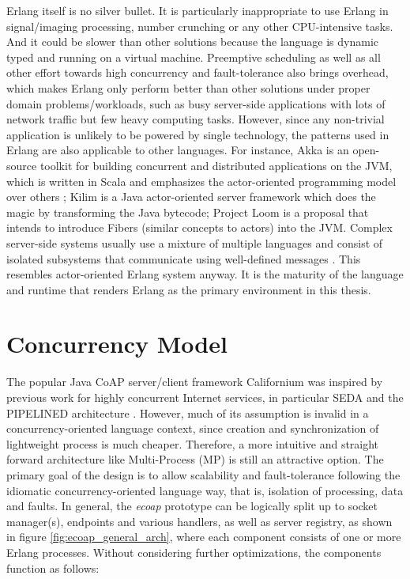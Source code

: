 Erlang itself is no silver bullet. It is particularly inappropriate to use Erlang in signal/imaging processing, number crunching or any other CPU-intensive tasks. And it could be slower than other solutions because the language is dynamic typed and running on a virtual machine. Preemptive scheduling as well as all other effort towards high concurrency and fault-tolerance also brings overhead, which makes Erlang only perform better than other solutions under proper domain problems/workloads, such as busy server-side applications with lots of network traffic but few heavy computing tasks. However, since any non-trivial application is unlikely to be powered by single technology, the patterns used in Erlang are also applicable to other languages. For instance, Akka \cite{akka} is an open-source toolkit for building concurrent and distributed applications on the JVM, which is written in Scala and emphasizes the actor-oriented programming model over others ; Kilim \cite{srinivasan2008kilim}\cite{UCAM-CL-TR-769} is a Java actor-oriented server framework which does the magic by transforming the Java bytecode; Project Loom \cite{java-loom} is a proposal that intends to introduce Fibers (similar concepts to actors) into the JVM. Complex server-side systems usually use a mixture of multiple languages and consist of isolated subsystems that communicate using well-defined messages \cite{UCAM-CL-TR-769}. This resembles actor-oriented Erlang system anyway. It is the maturity of the language and runtime that renders Erlang as the primary environment in this thesis.

\section{Concurrency Model}

The popular Java CoAP server/client framework Californium was inspired by previous work for highly concurrent Internet services, in particular SEDA and the PIPELINED architecture \cite{lanter2013scalability}\cite{kovatsch2015scalable}. However, much of its assumption is invalid in a concurrency-oriented language context, since creation and synchronization of lightweight process is much cheaper. Therefore, a more intuitive and straight forward architecture like Multi-Process (MP) is still an attractive option. The primary goal of the design is to allow scalability and fault-tolerance following the idiomatic concurrency-oriented language way, that is, isolation of processing, data and faults. In general, the \textit{ecoap} prototype can be logically split up to socket manager(s), endpoints and various handlers, as well as server registry, as shown in figure \ref{fig:ecoap_general_arch}, where each component consists of one or more Erlang processes. Without considering further optimizations, the components function as follows:

